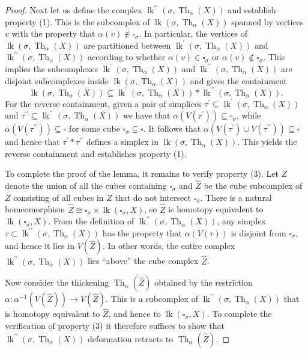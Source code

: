 \documentclass[12pt, letterpaper]{article}
\newcommand{\Th}{\operatorname{Th}}
\newcommand{\lk}{\operatorname{lk}}
\theoremstyle{plain}
\theoremstyle{definition}
\begin{document}
\begin{proof}
Next let us define the complex $\lk^{\prime \prime}(\sigma, \Th_\alpha(X))$ and establish property (1). This is the subcomplex of $\lk(\sigma, \Th_\alpha(X))$ spanned by vertices $v$ with the property that $\alpha(v)\notin \square_\sigma$. In particular, the vertices of $\lk(\sigma, \Th_\alpha(X))$ are partitioned between $\lk^\prime(\sigma, \Th_\alpha(X))$ and $\lk^{\prime \prime}(\sigma, \Th_\alpha(X))$ according to whether $\alpha(v)\in \square_\sigma$ or $\alpha(v)\notin \square_\sigma$. This implies the subcomplexes $\lk^\prime(\sigma, \Th_\alpha(X))$ and $\lk^{\prime \prime}(\sigma, \Th_\alpha(X))$ are disjoint subcomplexes inside $\lk(\sigma, \Th_\alpha(X))$ and gives the containment 
    \[ \lk(\sigma, \Th_\alpha(X)) \subseteq \lk^\prime(\sigma, \Th_\alpha(X))*\lk^{\prime \prime}(\sigma, \Th_\alpha(X)). \]
For the reverse containment, given a pair of simplices $\tau^\prime \subseteq \lk^\prime(\sigma, \Th_\alpha(X))$ and $\tau^{\prime \prime} \subseteq \lk^{\prime \prime}(\sigma, \Th_\alpha(X))$ we have that $\alpha(V(\tau^\prime))\subseteq \square_\sigma$, while $\alpha(V(\tau^{\prime \prime}))\subseteq \square$ for some cube $\square_\sigma \subsetneq \square$. It follows that $\alpha(V(\tau^\prime) \cup V(\tau^{\prime \prime})) \subseteq \square$ and hence that $\tau^\prime * \tau^{\prime \prime}$ defines a simplex in $\lk(\sigma, \Th_\alpha(X))$. This yields the reverse containment and establishes property (1).

\medskip

To complete the proof of the lemma, it remains to verify property (3). Let $Z$ denote the union of all the cubes containing $\square_\sigma$ and $\hat Z$ be the cube subcomplex of $Z$ consisting of all cubes in $Z$ that do not intersect $\square_\sigma$. There is a natural homeomorphism $\hat Z \cong \square_\sigma \times \lk(\square_\sigma , X)$, so $\hat Z$ is homotopy equivalent to $\lk(\square_\sigma , X)$. From the definition of $\lk^{\prime \prime}(\sigma, \Th_\alpha(X))$, any simplex $\tau\subset \lk^{\prime \prime}(\sigma, \Th_\alpha(X))$ has the property that $\alpha(V(\tau))$ is disjoint from $\square_\sigma$, and hence it lies in $V(\hat Z)$. In other words, the entire complex $\lk^{\prime \prime}(\sigma, \Th_\alpha(X))$ lies ``above'' the cube complex $\hat Z$. 

Now consider the thickening $\Th_\alpha(\hat Z)$ obtained by the restriction $\alpha \colon \alpha^{-1}(V(\hat Z)) \rightarrow V( \hat Z)$. This is a subcomplex of $\lk^{\prime \prime}(\sigma, \Th_\alpha(X))$ that is homotopy equivalent to $\hat Z$, and hence to $\lk(\square_\sigma , X)$. To complete the verification of property (3) it therefore suffices to show that $\lk^{\prime \prime}(\sigma, \Th_\alpha(X))$ deformation retracts to $\Th_\alpha(\hat Z)$. 


\end{proof}
\end{document}
